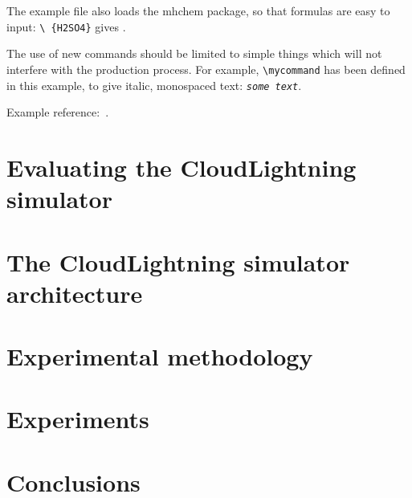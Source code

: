 \documentclass[
journal=jacsat, %
manuscript=article]{achemso}
\newcommand*{\mycommand}[1]{\texttt{\emph{#1}}}
\begin{document}
The example file also loads the \textsf{mhchem} package, so
that formulas are easy to input: \texttt{\textbackslash
\ce\{H2SO4\}} gives .

The use of new commands should be limited to simple things which will
not interfere with the production process.  For example,
\texttt{\textbackslash mycommand} has been defined in this example,
to give italic, monospaced text: \mycommand{some text}.

Example reference:~\cite{Einstein}.

\section{Evaluating the CloudLightning simulator}

\section{The CloudLightning simulator architecture}

\section{Experimental methodology}

\section{Experiments}

\section{Conclusions}



\end{document}
